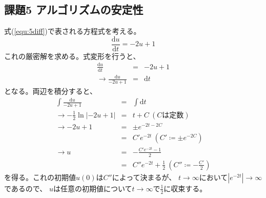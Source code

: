 \documentclass[a4j, titlepage]{jsarticle}
\numberwithin{equation}{section}
\begin{document}
    \subsection{課題5 アルゴリズムの安定性}
        式(\ref{equ:5diff})で表される方程式を考える。
        \begin{equation}
            \frac{\mathrm{d}u}{\mathrm{d}t} = -2u + 1 \label{equ:5diff}
        \end{equation}
        これの厳密解を求める。式変形を行うと、
        \begin{eqnarray*}
            \frac{\mathrm{d}u}{\mathrm{d}t} &=& -2u + 1 \\
            \rightarrow \frac{\mathrm{d}u}{-2u + 1} &=& \mathrm{d}t
        \end{eqnarray*}
        となる。両辺を積分すると、
        \begin{eqnarray*}
            \int\frac{\mathrm{d}u}{-2u + 1} &=& \int\mathrm{d}t \\
            \rightarrow -\frac{1}{2}\ln|-2u + 1| &=& t + C \ (Cは定数) \\
            \rightarrow -2u + 1 &=& \pm e^{-2t - 2C} \\
            &=& C'e^{-2t} \ (C' \coloneqq \pm e^{-2C}) \\
            \rightarrow u &=& -\frac{C'e^{-2t} - 1}{2} \\
            &=& C''e^{-2t} + \frac{1}{2} \ \left(C'' \coloneqq -\frac{C'}{2}\right)
        \end{eqnarray*}
        を得る。これの初期値$u(0)$は$C''$によって決まるが、
        $t \rightarrow \infty$において$\left|e^{-2t}\right|\rightarrow\infty$であるので、
        $u$は任意の初期値について$t\rightarrow\infty$で$\displaystyle\frac{1}{2}$に収束する。
\end{document}
